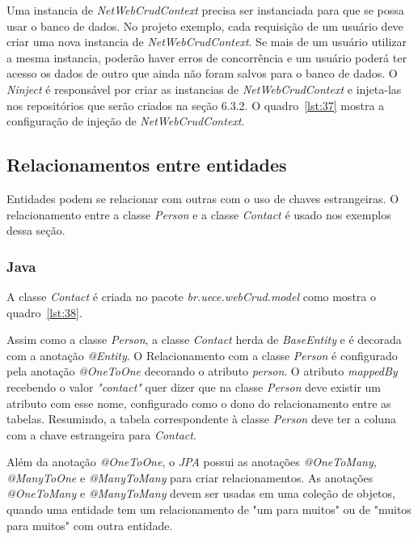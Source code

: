 \documentclass[a4paper,12pt]{article}
\newcommand{\est}[1] {
\textit{#1}}
\newcommand{\classe}[1] {
\textit{#1}}
\newcommand{\sigla}[1] {
\textit{#1}}
\newcommand{\annotation}[1] {
\textit{#1}}
\newcommand{\pacote}[1] {
\textit{#1}}
\newcommand{\javacode}[3] {
	
}
\newcommand{\sharpcode}[3] {
	
}
\begin{document}
Uma instancia de \classe{NetWebCrudContext} precisa ser instanciada para que se possa usar o banco de dados. No projeto exemplo, cada requisição de um usuário deve criar uma nova instancia de \classe{NetWebCrudContext}. Se mais de um usuário utilizar a mesma instancia, poderão haver erros de concorrência e um usuário poderá ter acesso os dados de outro que ainda não foram salvos para o banco de dados. O \est{Ninject} é responsável por criar as instancias de \classe{NetWebCrudContext} e injeta-las nos repositórios que serão criados na seção 6.3.2. O quadro~\ref{lst:37} mostra a configuração de injeção de \classe{NetWebCrudContext}.

\sharpcode{code/37.txt}{Injeção do contexto do banco de dados}{lst:37}

\subsection{Relacionamentos entre entidades}

Entidades podem se relacionar com outras com o uso de chaves estrangeiras. O relacionamento entre a classe \classe{Person} e a classe \classe{Contact} é usado nos exemplos dessa seção.

\subsubsection{Java}

A classe \classe{Contact} é criada no pacote \pacote{br.uece.webCrud.model} como mostra o quadro~\ref{lst:38}.

\javacode{code/38.txt}{Classe Contact no projeto Java}{lst:38}

Assim como a classe \classe{Person}, a classe \classe{Contact} herda de \classe{BaseEntity} e é decorada com a anotação \annotation{@Entity}. O Relacionamento com a classe \classe{Person} é configurado pela anotação \annotation{@OneToOne} decorando o atributo \est{person}. O atributo \est{mappedBy} recebendo o valor \est{"contact"} quer dizer que na classe \classe{Person} deve existir um atributo com esse nome, configurado como o dono do relacionamento entre as tabelas. Resumindo, a tabela correspondente à classe \classe{Person} deve ter a coluna com a chave estrangeira para \classe{Contact}.

Além da anotação \annotation{@OneToOne}, o \sigla{JPA} possui as anotações \annotation{@OneToMany}, \annotation{@ManyToOne} e \annotation{@ManyToMany} para criar relacionamentos. As anotações \annotation{@OneToMany} e \annotation{@ManyToMany} devem ser usadas em uma coleção de objetos, quando uma entidade tem um relacionamento de "um para muitos" ou de "muitos para muitos" com outra entidade.
\end{document}
